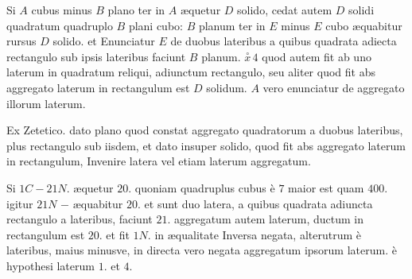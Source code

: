 \documentclass[11pt,a4paper]{article}
\begin{document}
Si $A$ cubus minus $B$ plano ter in $A$ æquetur $D$ solido, cedat autem $D$ solidi quadratum quadruplo $B$ plani cubo: $B$ planum ter in $E$ minus $E$ cubo æquabitur rursus $D$ solido. et Enunciatur $E$ de duobus lateribus a quibus  quadrata adiecta rectangulo sub ipsis lateribus faciunt $B$ planum.  $\overset{\circ}{x}\,4$ quod autem fit ab uno laterum in quadratum reliqui, adiunctum rectangulo, seu aliter quod fit abs aggregato laterum in rectangulum est $D$ solidum. $A$ vero enunciatur de aggregato illorum laterum.

Ex Zetetico. dato plano quod constat aggregato quadratorum a duobus lateribus, plus rectangulo sub iisdem, et dato insuper solido, quod fit abs aggregato laterum in rectangulum, Invenire latera vel etiam laterum aggregatum.

Si $1C - 21N.$ æquetur $20$. quoniam quadruplus cubus è $7$ maior est quam $400$. igitur $21N$ $-$   æquabitur $20$. et sunt duo latera, a quibus quadrata adiuncta rectangulo a lateribus, faciunt $21$. aggregatum autem laterum, ductum in rectangulum est $20$. et fit $1N.$ in æqualitate Inversa negata, alterutrum è lateribus, maius minusve, in directa vero negata aggregatum ipsorum laterum. è hypothesi laterum $1.$ et $4.$
\end{document}
